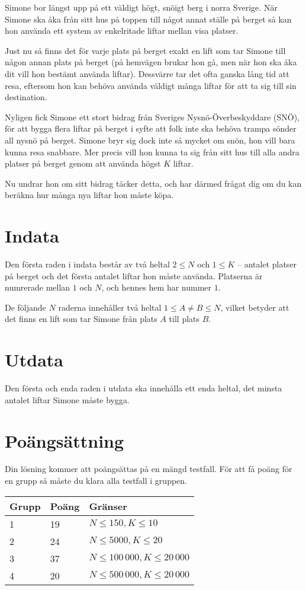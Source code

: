 
Simone bor längst upp på ett väldigt högt, snöigt berg i norra Sverige. När Simone ska åka från sitt hus på toppen till något annat ställe på berget så kan hon använda ett system av enkelritade liftar mellan visa platser.

Just nu så finns det för varje plats på berget exakt en lift som tar Simone till någon annan plats på berget (på hemvägen brukar hon gå, men när hon ska åka dit vill hon bestämt använda liftar). Dessvärre tar det ofta ganska lång tid att resa, eftersom hon kan behöva använda väldigt många liftar för att ta sig till sin destination.

Nyligen fick Simone ett stort bidrag från Sveriges Nysnö-Överbeskyddare (SNÖ), för att bygga flera liftar på berget i syfte att folk inte ska behöva trampa sönder all nysnö på berget. Simone bryr sig dock inte så mycket om snön, hon vill bara kunna resa snabbare. Mer precis vill hon kunna ta sig från sitt hus till alla andra platser på berget genom att använda högst $K$ liftar.

Nu undrar hon om sitt bidrag täcker detta, och har därmed frågat dig om du kan beräkna hur många nya liftar hon måste köpa.

\section*{Indata}
Den första raden i indata består av två heltal $2 \le N$ och $1 \le K$ -- antalet platser på berget och det första antalet liftar hon måste använda. Platserna är numrerade mellan $1$ och $N$, och hennes hem har nummer $1$.

De följande $N$ raderna innehåller två heltal $1 \le A \not= B \le N$, vilket betyder att det finns en lift som tar Simone från plats $A$ till plats $B$.

\section*{Utdata}
Den första och enda raden i utdata ska innehålla ett enda heltal, det minsta antalet liftar Simone måste bygga.

\section*{Poängsättning}
Din lösning kommer att poängsättas på en mängd testfall. För att få poäng för en grupp så måste du klara alla testfall i gruppen.

\begin{tabular}{|l|l|l|}
\hline
Grupp & Poäng & Gränser \\ \hline
1 & 19 & $N \le 150, K \le 10$ \\ \hline
2 & 24 & $N \le 5000, K \le 20$ \\ \hline
3 & 37 & $N \le 100\,000, K \le 20\,000$ \\ \hline
4 & 20 & $N \le 500\,000, K \le 20\,000$ \\ \hline
\end{tabular}
